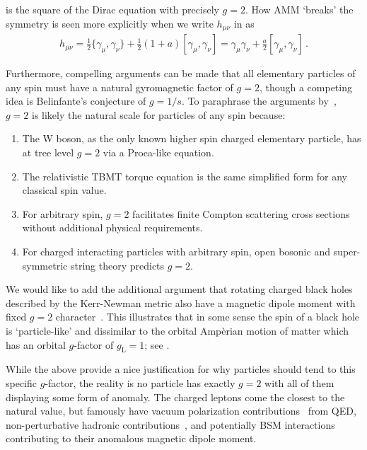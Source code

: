  is the square of the Dirac equation with precisely $g\!=\!2$. How AMM `breaks' the symmetry is seen more explicitly when we write $h_{\mu\nu}$ in  as
\begin{gather}
    \label{spinstruc}
    h_{\mu\nu}=\frac{1}{2}\{\gamma_{\mu},\gamma_{\nu}\}+\frac{1}{2}(1+a)[\gamma_{\mu},\gamma_{\nu}]=\gamma_{\mu}\gamma_{\nu}+\frac{a}{2}[\gamma_{\mu},\gamma_{\nu}]\,.
\end{gather}

Furthermore, compelling arguments can be made that all elementary particles of any spin must have a natural gyromagnetic factor of $g\!=\!2$, though a competing idea is Belinfante's conjecture of $g\!=\!1/s$. To paraphrase the arguments by~\citet*{Ferrara:1992yc}, $g\!=\!2$ is likely the natural scale for particles of any spin because:
\begin{enumerate}[nosep]
	\item The W boson, as the only known higher spin charged elementary particle, has at tree level $g\!=\!2$ via a Proca-like equation.
	\item The relativistic TBMT torque equation is the same simplified form for any classical spin value.
	\item For arbitrary spin, $g\!=\!2$ facilitates finite Compton scattering cross sections without additional physical requirements.
	\item For charged interacting particles with arbitrary spin, open bosonic and super-symmetric string theory predicts $g\!=\!2$.
\end{enumerate}
We would like to add the additional argument that rotating charged black holes described by the Kerr-Newman metric also have a magnetic dipole moment with fixed $g\!=\!2$ character~\citep{Carter:1968rr}. This illustrates that in some sense the spin of a black hole is `particle-like' and dissimilar to the orbital Amp{\`e}rian motion of matter which has an orbital $g$-factor of $g_\mathrm{L}\!=\!1$; see .

While the above provide a nice justification for why particles should tend to this specific $g$-factor, the reality is no particle has exactly $g\!=\!2$ with all of them displaying some form of anomaly. The charged leptons come the closest to the natural value, but famously have vacuum polarization contributions~\citep{Schwinger:1951nm} from QED, non-perturbative hadronic contributions~\citep{Jegerlehner:2017gek}, and potentially BSM interactions~\citep{Knecht:2003kc} contributing to their anomalous magnetic dipole moment.


